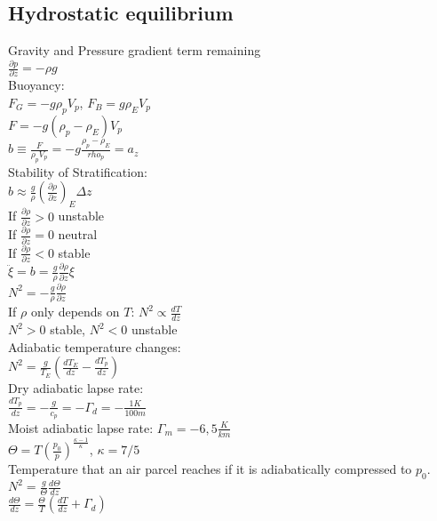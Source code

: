 \subsection*{Hydrostatic equilibrium}
Gravity and Pressure gradient term remaining\\
$\frac{\partial p}{\partial z}=-\rho g$\\
Buoyancy:\\
$F_G=-g\rho_pV_p$, $F_B=g\rho_EV_p$\\
$F=-g(\rho_p-\rho_E)V_p$\\
$b\equiv \frac{F}{\rho_p V_p}=-g\frac{\rho_p-\rho_E}{rho_p}=a_z$\\
Stability of Stratification:\\
$b\approx\frac{g}{\rho}\left(\frac{\partial\rho}{\partial z}\right)_E \Delta z$\\
If $\frac{\partial\rho}{\partial z}>0$ unstable\\
If $\frac{\partial\rho}{\partial z}=0$ neutral\\
If $\frac{\partial\rho}{\partial z}<0$ stable\\
$\ddot{\xi}=b=\frac{g}{\rho}\frac{\partial\rho}{\partial z} \xi$\\
$N^2=-\frac{g}{\rho}\frac{\partial\rho}{\partial z}$\\
If $\rho$ only depends on $T$: $N^2\propto \frac{dT}{dz}$\\
$N^2>0$ stable, $N^2<0$ unstable\\
Adiabatic temperature changes:\\
$N^2=\frac{g}{T_E}\left(\frac{dT_E}{dz}-\frac{dT_p}{dz}\right)$\\
Dry adiabatic lapse rate:\\ $\frac{dT_p}{dz}=-\frac{g}{c_p}=-\Gamma_d=-\frac{1K}{100m}$\\
Moist adiabatic lapse rate: $\Gamma_m=-6,5\frac{K}{km}$\\
$\Theta=T\left(\frac{p_0}{p}\right)^{\frac{\kappa-1}{\kappa}}$, $\kappa = 7/5$\\
Temperature that an air parcel reaches if it is adiabatically compressed to $p_0$.\\
$N^2 = \frac{g}{\Theta}\frac{d\Theta}{dz}$\\
$\frac{d\Theta}{dz}=\frac{\Theta}{T}\left(\frac{dT}{dz}+\Gamma_d\right)$
